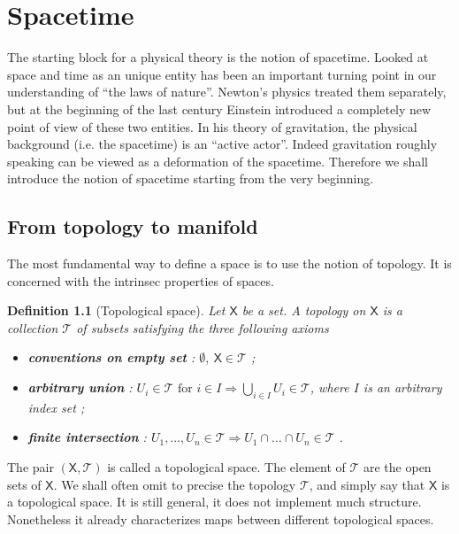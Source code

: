 \documentclass[10pt]{book}
\newcommand{\Tcal}{\mathcal{T}}
\newcommand{\Xsf}{\mathsf{X}}
\theoremstyle{break}
\newtheorem{definition}{Definition}
\begin{document}
\chapter{Spacetime}


The starting block for a physical theory is the notion of spacetime. Looked at space and time as an unique entity has been an important turning point in our understanding of ``the laws of nature''. Newton's physics treated them separately, but at the beginning of the last century Einstein introduced a completely new point of view of these two entities. In his theory of gravitation, the physical background (i.e. the spacetime) is an ``active actor''. Indeed gravitation roughly speaking can be viewed as a deformation of the spacetime. Therefore we shall introduce the notion of spacetime starting from the very beginning.


\section{From topology to manifold}

The most fundamental way to define a space is to use the notion of topology. It is concerned with the intrinsec properties of spaces.

\begin{definition}[Topological space] 
Let $\Xsf$ be a set. A topology on $\Xsf$ is a collection $\Tcal$ of subsets satisfying the three following axioms%
%
\begin{itemize}
\vspace*{-4pt}
\setlength{\itemsep}{-1pt}
\item \textbf{conventions on empty set} : $\emptyset , \ \Xsf \in \Tcal$ ;
\item \textbf{arbitrary union} : $U_i \in \Tcal \mbox{ for } i \in I \Longrightarrow \bigcup_{i\in I} U_i \in \Tcal$, where $I$ is an arbitrary index set ;
\item \textbf{finite intersection} : $U_1 , \dots , U_n \in \Tcal \Longrightarrow U_1 \cap \dots \cap U_n \in \Tcal$ .
\end{itemize}
%
\end{definition}


The pair $(\Xsf,\Tcal)$ is called a topological space. The element of $\Tcal$ are the open sets of $\Xsf$. We shall often omit to precise the topology $\Tcal$, and simply say that $\Xsf$ is a topological space. It is still general, it does not implement much structure. Nonetheless it already characterizes maps between different topological spaces.\par%
\end{document}
